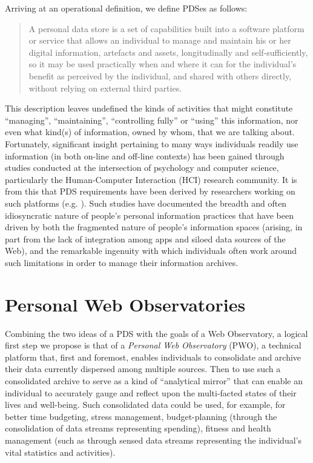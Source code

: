 \documentclass{acm_proc_article-sp}
\begin{document}
Arriving at an operational definition, we define PDSes as follows:

\begin{quote}

	A personal data store is a set of capabilities built into a software platform or service that allows an individual to manage and maintain his or her digital information, artefacts and assets, longitudinally and self-sufficiently, so it may be used practically when and where it can for the individual's benefit as perceived by the individual, and shared with others directly, without relying on external third parties. 

\end{quote}

This description leaves undefined the kinds of activities that might constitute ``managing'', ``maintaining'', ``controlling fully'' or ``using'' this information, nor even what kind(s) of information, owned by whom, that we are talking about. Fortunately, significant insight pertaining to many ways individuals readily use information (in both on-line and off-line contexts) has been gained through studies conducted at the intersection of psychology and computer science, particularly the Human-Computer Interaction (HCI) research community. It is from this that PDS requirements have been derived by researchers working on such platforms (e.g. \cite{pds-chapter}). Such studies have documented the breadth and often idiosyncratic nature of people's personal information practices that have been driven by both the fragmented nature of people's information spaces (arising, in part from the lack of integration among apps and siloed data sources of the Web), and the remarkable ingenuity with which individuals often work around such limitations in order to manage their information archives. 

\section{Personal Web Observatories}

Combining the two ideas of a PDS with the goals of a Web Observatory, a logical first step we propose is that of a \emph{Personal Web Observatory} (PWO), a technical platform that, first and foremost, enables individuals to consolidate and archive their data currently dispersed among multiple sources. Then to use such a consolidated archive to serve as a kind of ``analytical mirror'' that can enable an individual to accurately gauge and reflect upon the multi-facted states of their lives and well-being. Such consolidated data could be used, for example, for better time budgeting, stress management, budget-planning (through the consolidation of data streams representing spending), fitness and health management (such as through sensed data streams representing the individual's vital statistics and activities). 
\end{document}
